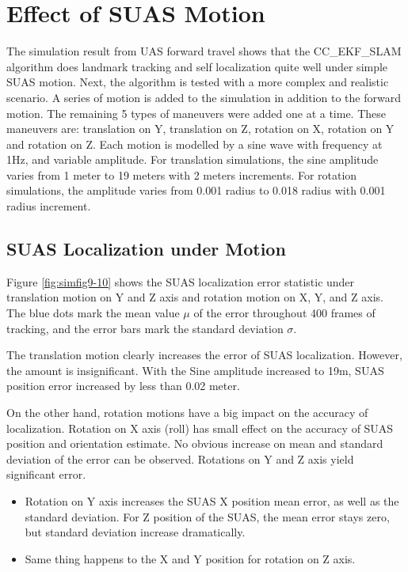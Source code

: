\section{Effect of SUAS Motion}
The simulation result from UAS forward travel shows that the CC\_EKF\_SLAM algorithm does landmark tracking and self localization quite well under simple SUAS motion. Next, the algorithm is tested with a more complex and realistic scenario. A series of motion is added to the simulation in addition to the forward motion. The remaining 5 types of maneuvers were added one at a time. These maneuvers are: translation on Y, translation on Z, rotation on X, rotation on Y and rotation on Z. Each motion is modelled by a sine wave with frequency at 1Hz, and variable amplitude. For translation simulations, the sine amplitude varies from 1 meter to 19 meters with 2 meters increments. For rotation simulations, the amplitude varies from 0.001 radius to 0.018 radius with 0.001 radius increment.

\subsection{SUAS Localization under Motion}

Figure \ref{fig:simfig9-10} shows the SUAS localization error statistic under translation motion on Y and Z axis and rotation motion on X, Y, and Z axis. The blue dots mark the mean value $\mu$ of the error throughout 400 frames of tracking, and the error bars mark the standard deviation $\sigma$.

The translation motion clearly increases the error of SUAS localization. However, the amount is insignificant. With the Sine amplitude increased to 19m, SUAS position error increased by less than 0.02 meter.

On the other hand, rotation motions have a big impact on the accuracy
of localization. Rotation on X axis (roll) has small effect on the accuracy of SUAS position and orientation estimate. No obvious increase on mean and standard deviation of the error can be observed. Rotations on Y and Z axis yield significant error.

\begin{itemize}
  \item Rotation on Y axis increases the SUAS X position mean error, as well as the standard deviation. For Z position of the SUAS, the mean error stays zero, but standard deviation increase dramatically.
  \item Same thing happens to the X and Y position for rotation on Z axis.
\end{itemize}

